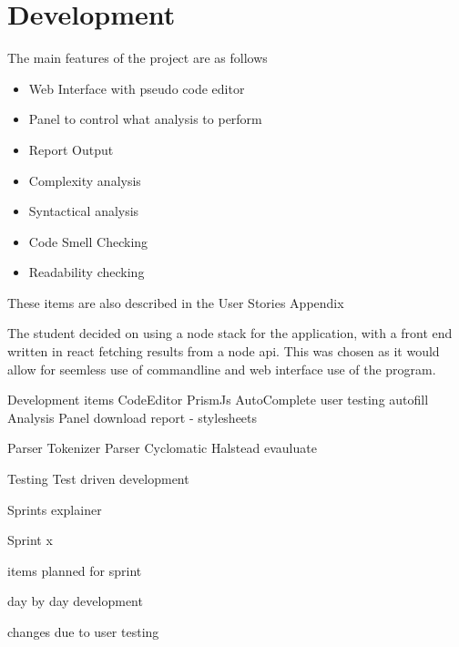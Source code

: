 \section{Development}
The main features of the project are as follows
\begin{itemize}
    \item Web Interface with pseudo code editor
    \item Panel to control what analysis to perform
    \item Report Output
    \item Complexity analysis
    \item Syntactical analysis
    \item Code Smell Checking
    \item Readability checking
\end{itemize}

These items are also described in the User Stories Appendix

The student decided on using a node stack for the application, with a front end written in react fetching results from a node api.
\newline
This was chosen as it would allow for seemless use of commandline and web interface use of the program.

Development items 
    CodeEditor
        PrismJs
        AutoComplete 
            user testing
        autofill
    Analysis Panel
        download report - stylesheets

    Parser
        Tokenizer
        Parser
        Cyclomatic
        Halstead
        evauluate

        Testing
            Test driven development

Sprints explainer

Sprint x 

items planned for sprint

day by day development

changes due to user testing